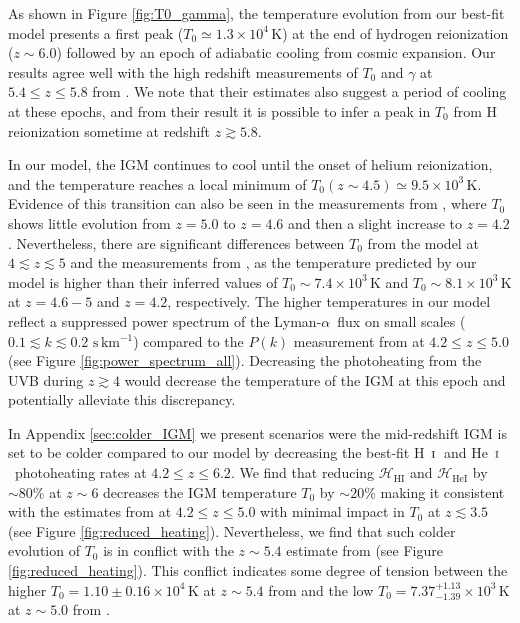 \documentclass[twocolumn]{aastex62}
\newcommand\Lya{Lyman-$\alpha$}
\def\HI{\hbox{\rm H~$\scriptstyle\rm I$}}
\def\HeI{\hbox{He~$\scriptstyle\rm I$}}
\begin{document}
As shown in Figure \ref{fig:T0_gamma}, the temperature evolution from our best-fit model presents a
first peak ($T_0 \simeq 1.3 \times 10^4 \, \mathrm{K}$)  at the end of hydrogen 
reionization ($z\sim 6.0$) followed by an epoch of adiabatic cooling from cosmic expansion.
Our results agree well with the high redshift measurements of $T_0$ and $\gamma$ at $ 5.4 \leq z \leq 5.8$ from \cite{gaikwad2020a}. We note that their estimates also suggest a period of cooling at these epochs, and from their result it is possible to infer a peak in $T_0$ from H reionization sometime at redshift $z\gtrsim 5.8$.

In our model,
the IGM continues to cool until the onset of helium reionization, 
and the temperature reaches a local minimum of 
$T_0(z\sim 4.5) \simeq 9.5\times 10^3\, \mathrm{K}$.
Evidence of this transition can also be seen in the measurements from \cite{boera2019a},
where $T_0$ shows little evolution from 
$z=5.0$ to $z=4.6$ and then a slight increase to $z=4.2$.
Nevertheless,  there are significant differences between $T_0$ from the model at $4 \lesssim z \lesssim 5$  and the 
measurements from \cite{boera2019a},
as the temperature predicted by our model is higher than their inferred values of 
$T_0 \sim 7.4 \times 10^3 \,\mathrm{K}$ and $T_0 \sim 8.1 \times 10^3 \,\mathrm{K}$ at $z=4.6-5$ and $z=4.2$, respectively.
The higher temperatures in our model 
reflect a suppressed power spectrum of the \Lya\ flux on small scales ($0.1 \lesssim k \lesssim 0.2 \,\,\mathrm{s \, km^{-1}}$) compared to the $P(k)$ measurement from 
\cite{boera2019a} at $4.2 \leq z \leq 5.0$ (see Figure \ref{fig:power_spectrum_all}).
Decreasing the photoheating from the UVB during $z\gtrsim 4$ would decrease 
the temperature of the IGM at this epoch and potentially alleviate this discrepancy. 

In Appendix \ref{sec:colder_IGM} we present scenarios were the mid-redshift IGM is set to be colder
compared to our model by decreasing the best-fit \HI\ and \HeI\ photoheating rates at $4.2 \leq z \leq 6.2$. We find that reducing $\mathcal{H}_\mathrm{HI}$ and 
$\mathcal{H}_\mathrm{HeI}$ by $\sim 80\%$ at $z\sim6$ decreases the IGM temperature $T_0$ by $\sim  20\%$ making it consistent with the estimates from 
\cite{boera2019a} at $4.2 \leq z \leq 5.0$ with minimal impact in $T_0$ at $z \lesssim 3.5$ (see Figure \ref{fig:reduced_heating}).
Nevertheless,  we find that such colder evolution of $T_0$ is in conflict with the $z\sim 5.4$ 
estimate from \cite{gaikwad2020a} (see Figure \ref{fig:reduced_heating}).
This conflict indicates some degree of tension between the higher 
$T_0=1.10 \pm 0.16 \times 10^4 \, \mathrm{K}$ at $z\sim5.4$ from \cite{gaikwad2020a} and the 
low $T_0=7.37^{+1.13}_{-1.39} \times 10^3 \, \mathrm{K}$ at $z\sim 5.0$ from \cite{boera2019a}.      
 
\end{document}
